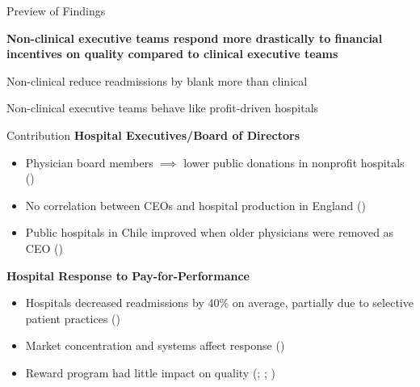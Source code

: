 \documentclass[notes,11pt, aspectratio=169]{beamer}
\newenvironment{wideitemize}{\itemize\addtolength{\itemsep}{10pt}}{\enditemize}
\begin{document}
\begin{frame}{Preview of Findings}

\textbf{Non-clinical executive teams respond more drastically to financial incentives on quality compared to clinical executive teams}

\vspace{2mm}

\begin{wideitemize}
    \item Non-clinical reduce readmissions by blank more than clinical
    \item Non-clinical executive teams behave like profit-driven hospitals
\end{wideitemize}
\end{frame}

\begin{frame}{Contribution}
    \textbf{Hospital Executives/Board of Directors}
    \begin{itemize}
        \item Physician board members $\implies$ lower public donations in nonprofit hospitals \scriptsize (\cite{brickley2010board}) \normalsize
        \item No correlation between CEOs and hospital production in England \scriptsize (\cite{janke2019impact})\normalsize
        \item Public hospitals in Chile improved when older physicians were removed as CEO \scriptsize (\cite{otero2022managers}) \normalsize
    \end{itemize}

    \vspace{5mm}

    \textbf{Hospital Response to Pay-for-Performance}
    \begin{itemize}
        \item Hospitals decreased readmissions by 40\% on average, partially due to selective patient practices \scriptsize (\cite{gupta2021impacts}) \normalsize
        \item Market concentration and systems affect response \scriptsize (\cite{kunz2024assessing}) \normalsize
        \item Reward program had little impact on quality \scriptsize (\cite{us2015hospital}; \cite{norton2018moneyball}; \cite{friedson2019so})
    \end{itemize}
\end{frame}
\end{document}

